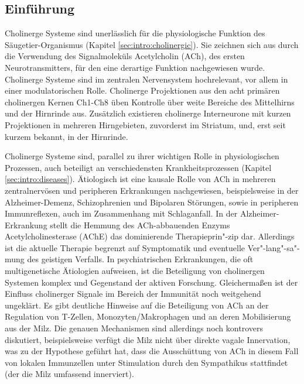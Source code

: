 \subsection{Einführung}
Cholinerge Systeme sind unerlässlich für die physiologische Funktion des Säugetier-Organismus (Kapitel \ref{sec:intro:cholinergic}). Sie zeichnen sich aus durch die Verwendung des Signalmoleküls Acetylcholin (ACh), des ersten Neurotransmitters, für den eine derartige Funktion nachgewiesen wurde. Cholinerge Systeme sind im zentralen Nervensystem hochrelevant, vor allem in einer modulatorischen Rolle. Cholinerge Projektionen aus den acht primären cholinergen Kernen Ch1-Ch8 üben Kontrolle über weite Bereiche des Mittelhirns und der Hirnrinde aus. Zusätzlich existieren cholinerge Interneurone mit kurzen Projektionen in mehreren Hirngebieten, zuvorderst im Striatum, und, erst seit kurzem bekannt, in der Hirnrinde.

Cholinerge Systeme sind, parallel zu ihrer wichtigen Rolle in physiologischen Prozessen, auch beteiligt an verschiedensten Krankheitsprozessen (Kapitel \ref{sec:intro:diseases}). Ätiologisch ist eine kausale Rolle von ACh in mehreren zentralnervösen und peripheren Erkrankungen nachgewiesen, beispielsweise in der Alzheimer-Demenz, Schizophrenien und Bipolaren Störungen, sowie in peripheren Immunreflexen, auch im Zusammenhang mit Schlaganfall. In der Alzheimer-Erkrankung stellt die Hemmung des ACh-abbauenden Enzyms Acetylcholinesterase (AChE) das dominierende Therapieprin"-zip dar. Allerdings ist die aktuelle Therapie begrenzt auf Symptomatik und eventuelle Ver"-lang"-sa"-mung des geistigen Verfalls. In psychiatrischen Erkrankungen, die oft multigenetische Ätiologien aufweisen, ist die Beteiligung von cholinergen Systemen komplex und Gegenstand der aktiven Forschung. Gleichermaßen ist der Einfluss cholinerger Signale im Bereich der Immunität noch weitgehend ungeklärt. Es gibt deutliche Hinweise auf die Beteiligung von ACh an der Regulation von T-Zellen, Monozyten/Makrophagen und an deren Mobilisierung aus der Milz. Die genauen Mechanismen sind allerdings noch kontrovers diskutiert, beispielsweise verfügt die Milz nicht über direkte vagale Innervation, was zu der Hypothese geführt hat, dass die Ausschüttung von ACh in diesem Fall von lokalen Immunzellen unter Stimulation durch den Sympathikus stattfindet (der die Milz umfassend innerviert).

